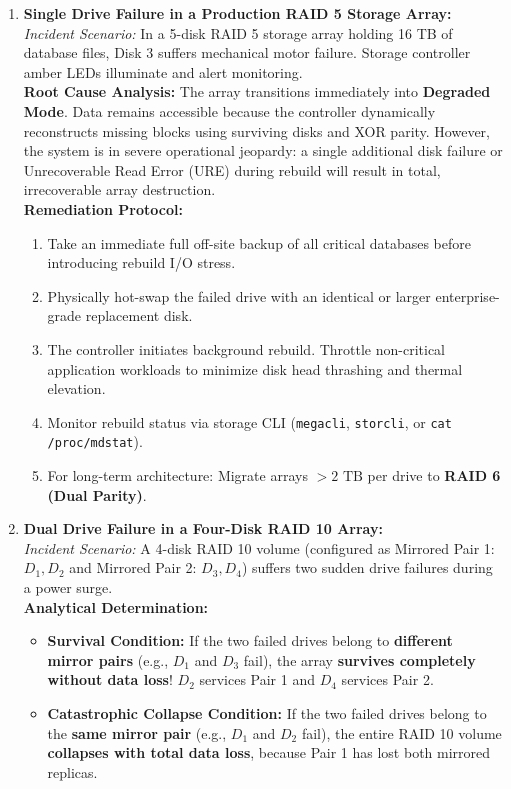 \begin{enumerate}[label=\textbf{Case \arabic*.},leftmargin=1.5cm]
\item \textbf{Single Drive Failure in a Production RAID 5 Storage Array:} \\
\textit{Incident Scenario:} In a 5-disk RAID 5 storage array holding 16 TB of database files, Disk 3 suffers mechanical motor failure. Storage controller amber LEDs illuminate and alert monitoring. \\
\textbf{Root Cause Analysis:} The array transitions immediately into \textbf{Degraded Mode}. Data remains accessible because the controller dynamically reconstructs missing blocks using surviving disks and XOR parity. However, the system is in severe operational jeopardy: a single additional disk failure or Unrecoverable Read Error (URE) during rebuild will result in total, irrecoverable array destruction. \\
\textbf{Remediation Protocol:}
\begin{enumerate}
    \item Take an immediate full off-site backup of all critical databases before introducing rebuild I/O stress.
    \item Physically hot-swap the failed drive with an identical or larger enterprise-grade replacement disk.
    \item The controller initiates background rebuild. Throttle non-critical application workloads to minimize disk head thrashing and thermal elevation.
    \item Monitor rebuild status via storage CLI (\texttt{megacli}, \texttt{storcli}, or \texttt{cat /proc/mdstat}).
    \item For long-term architecture: Migrate arrays $> 2\text{ TB}$ per drive to \textbf{RAID 6 (Dual Parity)}.
\end{enumerate}

\item \textbf{Dual Drive Failure in a Four-Disk RAID 10 Array:} \\
\textit{Incident Scenario:} A 4-disk RAID 10 volume (configured as Mirrored Pair 1: $D_1, D_2$ and Mirrored Pair 2: $D_3, D_4$) suffers two sudden drive failures during a power surge. \\
\textbf{Analytical Determination:}
\begin{itemize}
    \item \textbf{Survival Condition:} If the two failed drives belong to \textbf{different mirror pairs} (e.g., $D_1$ and $D_3$ fail), the array \textbf{survives completely without data loss}! $D_2$ services Pair 1 and $D_4$ services Pair 2.
    \item \textbf{Catastrophic Collapse Condition:} If the two failed drives belong to the \textbf{same mirror pair} (e.g., $D_1$ and $D_2$ fail), the entire RAID 10 volume \textbf{collapses with total data loss}, because Pair 1 has lost both mirrored replicas.
\end{itemize}


\end{enumerate}
